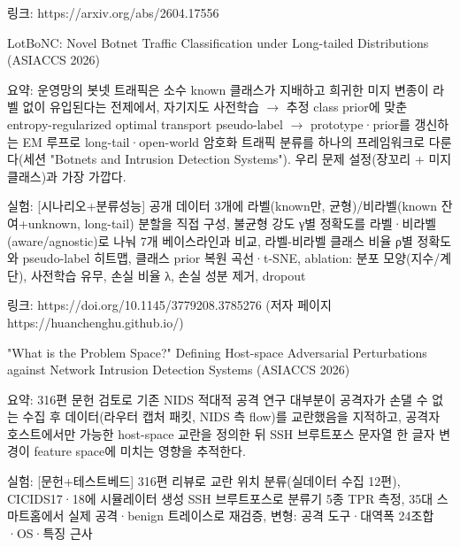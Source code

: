\par\noindent \textbullet\enspace 링크: https:/\allowbreak{}/\allowbreak{}arxiv.org/\allowbreak{}abs/\allowbreak{}2604.17556



\par\noindent \textbullet\enspace LotBoNC: Novel Botnet Traffic Classification under Long-tailed Distributions (ASIACCS 2026)

\par\noindent \textbullet\enspace 요약: 운영망의 봇넷 트래픽은 소수 known 클래스가 지배하고 희귀한 미지 변종이 라벨 없이 유입된다는 전제에서, 자기지도 사전학습  \ensuremath{\rightarrow}  추정 class prior에 맞춘 entropy-regularized optimal transport pseudo-label  \ensuremath{\rightarrow}  prototype·prior를 갱신하는 EM 루프로 long-tail·open-world 암호화 트래픽 분류를 하나의 프레임워크로 다룬다(세션 "Botnets and Intrusion Detection Systems"). 우리 문제 설정(장꼬리 +\allowbreak{} 미지 클래스)과 가장 가깝다.


\par\noindent \textbullet\enspace 실험: [시나리오+\allowbreak{}분류성능] 공개 데이터 3개에 라벨(known만, 균형)/\allowbreak{}비라벨(known 잔여+\allowbreak{}unknown, long-tail) 분할을 직접 구성, 불균형 강도 γ별 정확도를 라벨·비라벨(aware/\allowbreak{}agnostic)로 나눠 7개 베이스라인과 비교, 라벨-비라벨 클래스 비율 ρ별 정확도와 pseudo-label 히트맵, 클래스 prior 복원 곡선·t-SNE, ablation: 분포 모양(지수/\allowbreak{}계단), 사전학습 유무, 손실 비율 λ, 손실 성분 제거, dropout


\par\noindent \textbullet\enspace 링크: https:/\allowbreak{}/\allowbreak{}doi.org/\allowbreak{}10.1145/\allowbreak{}3779208.3785276 (저자 페이지 https:/\allowbreak{}/\allowbreak{}huanchenghu.github.io/\allowbreak{})



\par\noindent \textbullet\enspace "What is the Problem Space?" Defining Host-space Adversarial Perturbations against Network Intrusion Detection Systems (ASIACCS 2026)

\par\noindent \textbullet\enspace 요약: 316편 문헌 검토로 기존 NIDS 적대적 공격 연구 대부분이 공격자가 손댈 수 없는 수집 후 데이터(라우터 캡처 패킷, NIDS 측 flow)를 교란했음을 지적하고, 공격자 호스트에서만 가능한 host-space 교란을 정의한 뒤 SSH 브루트포스 문자열 한 글자 변경이 feature space에 미치는 영향을 추적한다.


\par\noindent \textbullet\enspace 실험: [문헌+\allowbreak{}테스트베드] 316편 리뷰로 교란 위치 분류(실데이터 수집 12편), CICIDS17·18에 시뮬레이터 생성 SSH 브루트포스로 분류기 5종 TPR 측정, 35대 스마트홈에서 실제 공격·benign 트레이스로 재검증, 변형: 공격 도구·대역폭 24조합·OS·특징 근사



